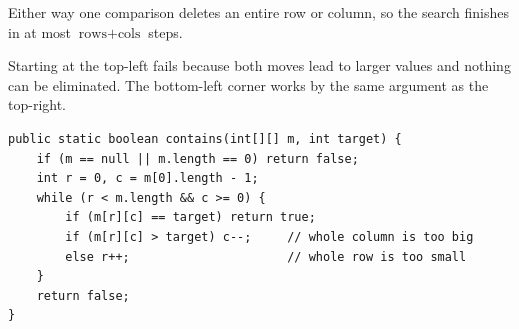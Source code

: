 Either way one comparison deletes an entire row or column, so the search
finishes in at most $\text{rows} + \text{cols}$ steps.

Starting at the top-left fails because both moves lead to larger values and
nothing can be eliminated. The bottom-left corner works by the same argument
as the top-right.

\solheading
\begin{lstlisting}[style=java]
public static boolean contains(int[][] m, int target) {
    if (m == null || m.length == 0) return false;
    int r = 0, c = m[0].length - 1;
    while (r < m.length && c >= 0) {
        if (m[r][c] == target) return true;
        if (m[r][c] > target) c--;     // whole column is too big
        else r++;                      // whole row is too small
    }
    return false;
}
\end{lstlisting}

